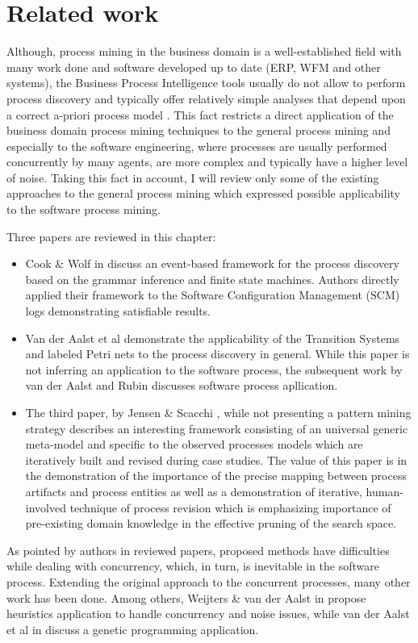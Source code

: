 \chapter{Related work} \label{related.work}
Although, process mining in the business domain is a well-established field with many work done and software developed up to date (ERP, WFM and other systems), the Business Process Intelligence tools usually do not allow to perform process discovery and typically offer relatively simple analyses that depend upon a correct a-priori process model \cite{citeulike:3718014} \cite{citeulike:5044991}. This fact restricts a direct application of the business domain process mining techniques to the general process mining and especially to the software engineering, where processes are usually performed concurrently by many agents, are more complex and typically have a higher level of noise. Taking this fact in account, I will review only some of the existing approaches to the general process mining which expressed possible applicability to the software process mining. 

Three papers are reviewed in this chapter: 
\begin{itemize}
	\item Cook \& Wolf in \cite{citeulike:328044} discuss an event-based framework for the process discovery based on the grammar inference and finite state machines. Authors directly applied their framework to the Software Configuration Management (SCM) logs demonstrating satisfiable results. 
	\item Van der Aalst et al \cite{citeulike:3718014} demonstrate the applicability of the Transition Systems and labeled Petri nets to the process discovery in general. While this paper is not inferring an application to the software process, the subsequent work by van der Aalst and Rubin \cite{citeulike:1885717} discusses software process apllication.
	\item The third paper, by Jensen \& Scacchi \cite{citeulike:5043664}, while not presenting a pattern mining strategy describes an interesting framework consisting of an universal generic meta-model and specific to the observed processes models which are iteratively built and revised during case studies. The value of this paper is in the demonstration of the importance of the precise mapping between process artifacts and process entities as well as a demonstration of iterative, human-involved technique of process revision which is emphasizing importance of pre-existing domain knowledge in the effective pruning of the search space.
\end{itemize}
As pointed by authors in reviewed papers, proposed methods have difficulties while dealing with concurrency, which, in turn, is inevitable in the software process. Extending the original approach to the concurrent processes, many other work has been done. Among others, Weijters \& van der Aalst in \cite{citeulike:5128101} propose heuristics application to handle concurrency and noise issues, while van der Aalst et al in \cite{citeulike:5128101} discuss a genetic programming application.
